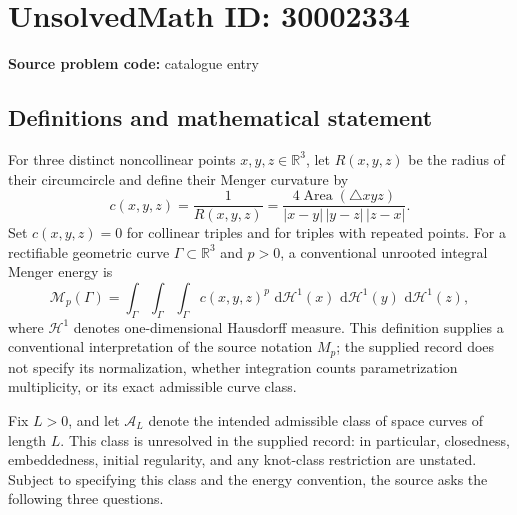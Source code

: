 \documentclass[11pt]{article}
\newcommand{\R}{\mathbb{R}}
\newcommand{\dd}{\,\mathrm{d}}
\begin{document}
\section*{UnsolvedMath ID: 30002334}
\textbf{Source problem code:} catalogue entry
\subsection{Definitions and mathematical statement}
For three distinct noncollinear points \(x,y,z\in\R^3\), let \(R(x,y,z)\) be the radius of their circumcircle and define their Menger curvature by
\[
 c(x,y,z)=\frac{1}{R(x,y,z)}
 =\frac{4\operatorname{Area}(\triangle xyz)}{|x-y|\,|y-z|\,|z-x|}.
\]
Set \(c(x,y,z)=0\) for collinear triples and for triples with repeated points. For a rectifiable geometric curve \(\Gamma\subset\R^3\) and \(p>0\), a conventional unrooted integral Menger energy is
\[
 \mathcal M_p(\Gamma)=\int_{\Gamma}\int_{\Gamma}\int_{\Gamma}
 c(x,y,z)^p\,\dd\mathcal H^1(x)\,\dd\mathcal H^1(y)\,\dd\mathcal H^1(z),
\]
where \(\mathcal H^1\) denotes one-dimensional Hausdorff measure. This definition supplies a conventional interpretation of the source notation \(M_p\); the supplied record does not specify its normalization, whether integration counts parametrization multiplicity, or its exact admissible curve class.

Fix \(L>0\), and let \(\mathcal A_L\) denote the intended admissible class of space curves of length \(L\). This class is unresolved in the supplied record: in particular, closedness, embeddedness, initial regularity, and any knot-class restriction are unstated. Subject to specifying this class and the energy convention, the source asks the following three questions.
\end{document}

